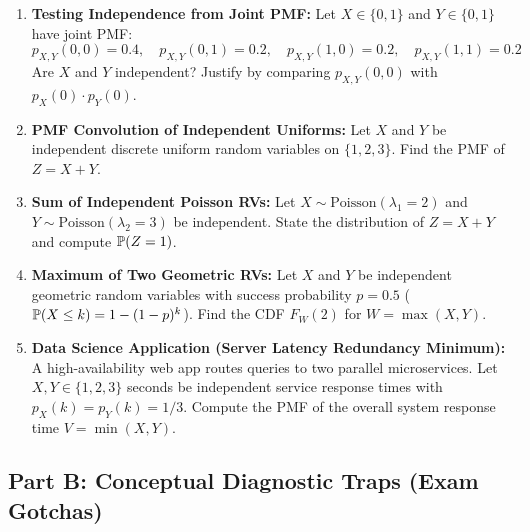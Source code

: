 \begin{enumerate}
\item \textbf{Testing Independence from Joint PMF:} Let $X \in \{0, 1\}$ and $Y \in \{0, 1\}$ have joint PMF:
    $$p_{X,Y}(0,0) = 0.4, \quad p_{X,Y}(0,1) = 0.2, \quad p_{X,Y}(1,0) = 0.2, \quad p_{X,Y}(1,1) = 0.2$$
    Are $X$ and $Y$ independent? Justify by comparing $p_{X,Y}(0,0)$ with $p_X(0) \cdot p_Y(0)$.

\item \textbf{PMF Convolution of Independent Uniforms:} Let $X$ and $Y$ be independent discrete uniform random variables on $\{1, 2, 3\}$. Find the PMF of $Z = X + Y$.

\item \textbf{Sum of Independent Poisson RVs:} Let $X \sim \text{Poisson}(\lambda_1 = 2)$ and $Y \sim \text{Poisson}(\lambda_2 = 3)$ be independent. State the distribution of $Z = X + Y$ and compute $\P(Z = 1)$.

\item \textbf{Maximum of Two Geometric RVs:} Let $X$ and $Y$ be independent geometric random variables with success probability $p = 0.5$ ($\P(X \le k) = 1 - (1-p)^k$). Find the CDF $F_W(2)$ for $W = \max(X, Y)$.

\item \textbf{Data Science Application (Server Latency Redundancy Minimum):} A high-availability web app routes queries to two parallel microservices. Let $X, Y \in \{1, 2, 3\}$ seconds be independent service response times with $p_X(k) = p_Y(k) = 1/3$. Compute the PMF of the overall system response time $V = \min(X, Y)$.
\end{enumerate}

\subsection*{Part B: Conceptual Diagnostic Traps (Exam Gotchas)}

